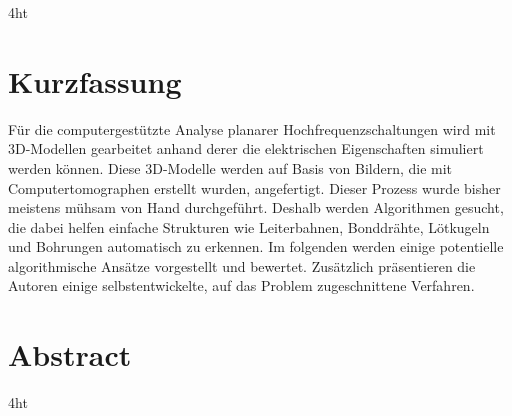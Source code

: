 \documentclass[
               paper=a4,,
               BCOR1.92mm,DIV12,headinclude, %
               bibliography=totoc,
               headsepline,
               cleardoublepage=empty,
               parskip=half,
               final   %
               ]{scrbook}
\let\ifdeutsch\iftrue
\begin{document}

\iftex4ht
\Configure{$}{\PicMath}{\EndPicMath}{} 
\fi

\VerbatimFootnotes %

\Titelblatt
\setcounter{page}{2}
\cleardoublepage
\pagestyle{preamble}
\renewcommand*{\chapterpagestyle}{preamble}

\ifdeutsch
\section*{Kurzfassung}
Für die computergestützte Analyse planarer Hochfrequenzschaltungen wird mit 3D-Modellen gearbeitet anhand derer die elektrischen Eigenschaften simuliert werden können. Diese 3D-Modelle werden auf Basis von Bildern, die mit Computertomographen erstellt wurden, angefertigt. \newline Dieser Prozess wurde bisher meistens mühsam von Hand durchgeführt. Deshalb werden Algorithmen gesucht, die dabei helfen einfache Strukturen wie Leiterbahnen, Bonddrähte, Lötkugeln und Bohrungen automatisch zu erkennen. Im folgenden werden einige potentielle algorithmische Ansätze vorgestellt und bewertet. Zusätzlich präsentieren die Autoren einige selbstentwickelte, auf das Problem zugeschnittene Verfahren.
\else
\section*{Abstract}
\fi
\cleardoublepage

\iftex4ht
\else
{}
\fi

%
%
\end{document}
